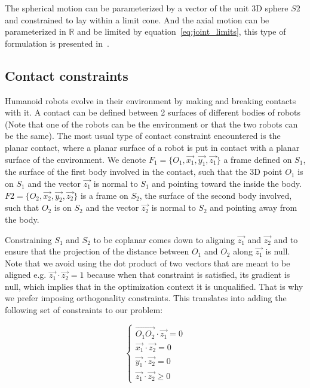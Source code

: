The spherical motion can be parameterized by a vector of the unit 3D sphere $S2$ and constrained to lay within a limit cone. And the axial motion can be parameterized in $\mathbb{R}$ and be limited by equation~\ref{eq:joint_limits}, this type of formulation is presented in~\cite{baerlocher}.



\subsection{Contact constraints}
\label{sub:contact_constraints}


Humanoid robots evolve in their environment by making and breaking contacts with it.
A contact can be defined between 2 surfaces of different bodies of robots (Note that one of the robots can be the environment or that the two robots can be the same).
The most usual type of contact constraint encountered is the planar contact, where a planar surface of a robot is put in contact with a planar surface of the environment.
We denote $F_1 = \{O_1, \vec{x_1}, \vec{y_1}, \vec{z_1}\}$ a frame defined on $S_1$, the surface of the first body involved in the contact, such that the 3D point $O_1$ is on $S_1$ and the vector $\vec{z_1}$ is normal to $S_1$ and pointing toward the inside the body.
$F2 = \{O_2, \vec{x_2}, \vec{y_2}, \vec{z_2}\}$ is a frame on $S_2$, the surface of the second body involved, such that $O_2$ is on $S_2$ and the vector $\vec{z_2}$ is normal to $S_2$ and pointing away from the body.

Constraining $S_1$ and $S_2$ to be coplanar comes down to aligning $\vec{z_1}$ and $\vec{z_2}$ and to ensure that the projection of the distance between $O_1$ and $O_2$ along $\vec{z_1}$ is null.
Note that we avoid using the dot product of two vectors that are meant to be aligned e.g. $\vec{z_1}\cdot\vec{z_2} = 1$ because when that constraint is satisfied, its gradient is null, which implies that in the optimization context it is unqualified.
That is why we prefer imposing orthogonality constraints.
This translates into adding the following set of constraints to our problem:

\begin{equation}
\label{eq:coplanarity}
\boxed{\left\{
  \begin{array}{l}
    \overrightarrow{O_1O_2} \cdot \vec{z_1} = 0\\
    \vec{x_1}\cdot\vec{z_2} = 0\\
    \vec{y_1}\cdot\vec{z_2} = 0\\
    \vec{z_1}\cdot\vec{z_2} \geq 0
  \end{array}
  \right.}
\end{equation}

